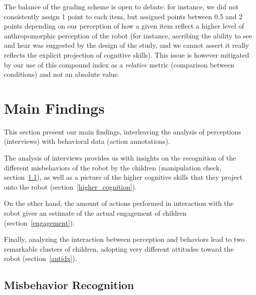\documentclass[letterpaper, 10pt, conference]{ieeeconf}
\begin{document}
The balance of the grading scheme is open to debate: for instance, we did not
consistently assign 1 point to each item, but assigned points between 0.5 and 2
points depending on our perception of how a given item reflect a higher level of
anthropomorphic perception of the robot (for instance, ascribing the ability to
see and hear was suggested by the design of the study, and we cannot assert it
really reflects the explicit projection of cognitive skills). This issue is
however mitigated by our use of this compound index as a \emph{relative} metric
(comparison between conditions) and not an absolute value.

\section{Main Findings}

This section present our main findings, interleaving the analysis of perceptions
(interviews) with behavioral data (action annotations).

The analysis of interviews provides us with insights on the recognition of the
different misbehaviors of the robot by the children (manipulation check,
section~\ref{reco}), as well as a picture of the higher cognitive skills that
they project onto the robot (section~\ref{higher_cognition}).

On the other hand, the amount of actions performed in interaction with the robot
gives an estimate of the actual engagement of children
(section~\ref{engagement}).

Finally, analyzing the interaction between perception and behaviors lead to 
two remarkable clusters of children, adopting very different attitudes toward the
robot (section~\ref{antidx}).

\subsection{Misbehavior Recognition}
\label{reco}

\end{document}
